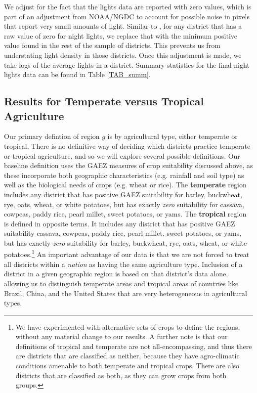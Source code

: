 \documentclass[11pt]{article}
\begin{document}
We adjust for the fact that the lights data are reported with zero values, which is part of an adjustment from NOAA/NGDC to account for possible noise in pixels that report very small amounts of light. Similar to \citet{hssw2016}, for any district that has a raw value of zero for night lights, we replace that with the minimum positive value found in the rest of the sample of districts. This prevents us from understating light density in those districts. Once this adjustment is made, we take logs of the average lights in a district. Summary statistics for the final night lights data can be found in Table \ref{TAB_summ}.

\subsection{Results for Temperate versus Tropical Agriculture}
Our primary defintion of region $g$ is by agricultural type, either temperate or tropical. There is no definitive way of deciding which districts practice temperate or tropical agriculture, and so we will explore several possible definitions. Our baseline definition uses the GAEZ measures of crop suitability discussed above, as these incorporate both geographic characteristics (e.g. rainfall and soil type) as well as the biological needs of crops (e.g. wheat or rice). The \textbf{temperate} region includes any district that has positive GAEZ suitability for barley, buckwheat, rye, oats, wheat, or white potatoes, but has exactly \textit{zero} suitability for cassava, cowpeas, paddy rice, pearl millet, sweet potatoes, or yams. The \textbf{tropical} region is defined in opposite terms. It includes any district that has positive GAEZ suitability cassava, cowpeas, paddy rice, pearl millet, sweet potatoes, or yams, but has exactly \textit{zero} suitability for barley, buckwheat, rye, oats, wheat, or white potatoes.\footnote{We have experimented with alternative sets of crops to define the regions, without any material change to our results. A further note is that our definitions of tropical and temperate are not all-encompassing, and thus there are districts that are classified as neither, because they have agro-climatic conditions amenable to both temperate and tropical crops. There are also districts that are classified as both, as they can grow crops from both groups.} An important advantage of our data is that we are not forced to treat all districts within a \textit{nation} as having the same agriculture type. Inclusion of a district in a given geographic region is based on that district's data alone, allowing us to distinguish temperate areas and tropical areas of countries like Brazil, China, and the United States that are very heterogeneous in agricultural types.
\end{document}
